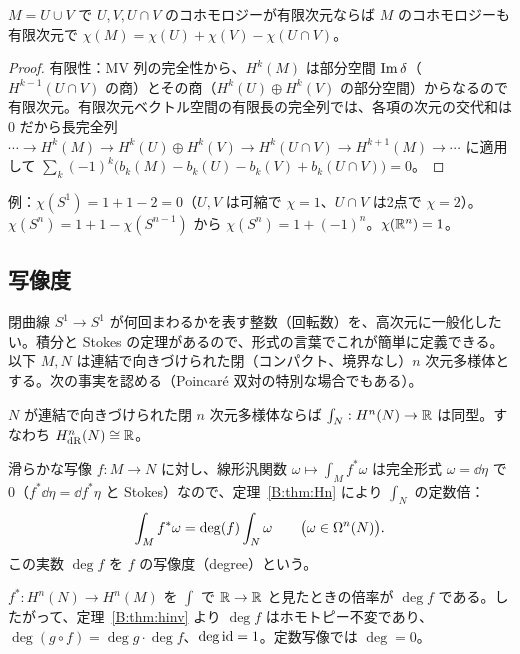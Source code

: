 \begin{prop}\label{B:prop:chi}\tP
$M=U\cup V$ で $U,V,U\cap V$ のコホモロジーが有限次元ならば $M$ のコホモロジーも有限次元で $\chi(M)=\chi(U)+\chi(V)-\chi(U\cap V)$。
\end{prop}
\begin{proof}
有限性：MV 列の完全性から、$H^k(M)$ は部分空間 $\operatorname{Im}\delta$（$H^{k-1}(U\cap V)$ の商）とその商（$H^k(U)\oplus H^k(V)$ の部分空間）からなるので有限次元。有限次元ベクトル空間の有限長の完全列では、各項の次元の交代和は $0$ だから長完全列 $\cdots\to H^k(M)\to H^k(U)\oplus H^k(V)\to H^k(U\cap V)\to H^{k+1}(M)\to\cdots$ に適用して $\sum_k(-1)^k\bigl(b_k(M)-b_k(U)-b_k(V)+b_k(U\cap V)\bigr)=0$。
\end{proof}
例：$\chi(S^1)=1+1-2=0$（$U,V$ は可縮で $\chi=1$、$U\cap V$ は2点で $\chi=2$）。$\chi(S^n)=1+1-\chi(S^{n-1})$ から $\chi(S^n)=1+(-1)^n$。$\chi(\mathbb R^n)=1$。

\subsection{写像度}\label{B:ss:degree}

閉曲線 $S^1\to S^1$ が何回まわるかを表す整数（回転数）を、高次元に一般化したい。積分と Stokes の定理があるので、形式の言葉でこれが簡単に定義できる。以下 $M,N$ は連結で向きづけられた閉（コンパクト、境界なし）$n$ 次元多様体とする。次の事実を認める（Poincaré 双対の特別な場合でもある）。

\begin{thm}\label{B:thm:Hn}\tC
$N$ が連結で向きづけられた閉 $n$ 次元多様体ならば $\int_N:H^n(N)\to\mathbb R$ は同型。すなわち $H^n_{\rm dR}(N)\cong\mathbb R$。
\end{thm}

\begin{defn}[写像度]\label{B:def:deg}
滑らかな写像 $f:M\to N$ に対し、線形汎関数 $\omega\mapsto\int_Mf^*\omega$ は完全形式 $\omega=\dd\eta$ で $0$（$f^*\dd\eta=\dd f^*\eta$ と Stokes）なので、定理~\ref{B:thm:Hn} により $\int_N$ の定数倍：
\[
\int_Mf^*\omega=\deg(f)\int_N\omega\qquad\bigl(\omega\in\Omega^n(N)\bigr).
\]
この実数 $\deg f$ を $f$ の写像度（degree）という。
\end{defn}

$f^*:H^n(N)\to H^n(M)$ を $\int$ で $\mathbb R\to\mathbb R$ と見たときの倍率が $\deg f$ である。したがって、定理~\ref{B:thm:hinv} より $\deg f$ はホモトピー不変であり、$\deg(g\circ f)=\deg g\cdot\deg f$、$\deg\mathrm{id}=1$。定数写像では $\deg=0$。

